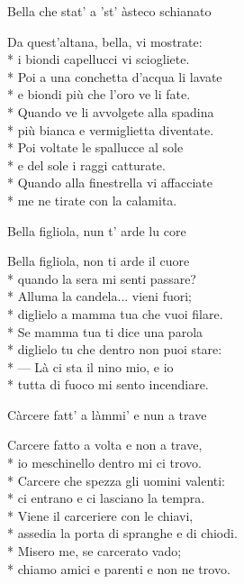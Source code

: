 \documentclass[11pt]{book}
\begin{document}
\begin{poem}{Bella che stat’ a ’st’ àsteco schianato}{}
\settowidth{\versewidth}{Quando alla finestrella vi affacciate}
\begin{altverse}
Da quest’altana, bella, vi mostrate:\\*
i biondi capellucci vi sciogliete.\\*
Poi a una conchetta d’acqua li lavate\\*
e biondi più che l’oro ve li fate.\\*
Quando ve li avvolgete alla spadina\\*
più bianca e vermiglietta diventate.\\*
Poi voltate le spallucce al sole\\*
e del sole i raggi catturate.\\*
Quando alla finestrella vi affacciate\\*
me ne tirate con la calamita.
\end{altverse}
\end{poem}

\begin{poem}{Bella figliola, nun t’ arde lu core}{}
\settowidth{\versewidth}{Diglielo tu che dentro non puoi stare}
\begin{altverse}
Bella figliola, non ti arde il cuore\\*
quando la sera mi senti passare?\\*
Alluma la candela... vieni fuori;\\*
diglielo a mamma tua che vuoi filare.\\*
Se mamma tua ti dice una parola\\*
diglielo tu che dentro non puoi stare:\\*
— Là ci sta il nino mio, e io\\*
tutta di fuoco mi sento incendiare.
\end{altverse}
\end{poem}

\begin{poem}{Càrcere fatt’ a làmmi’ e nun a trave}{}
\settowidth{\versewidth}{Assedia la porta di spranghe e di chiodi}
\begin{altverse}
Carcere fatto a volta e non a trave,\\*
io meschinello dentro mi ci trovo.\\*
Carcere che spezza gli uomini valenti:\\*
ci entrano e ci lasciano la tempra.\\*
Viene il carceriere con le chiavi,\\*
assedia la porta di spranghe e di chiodi.\\*
Misero me, se carcerato vado;\\*
chiamo amici e parenti e non ne trovo.
\end{altverse}
\end{poem}
\end{document}
